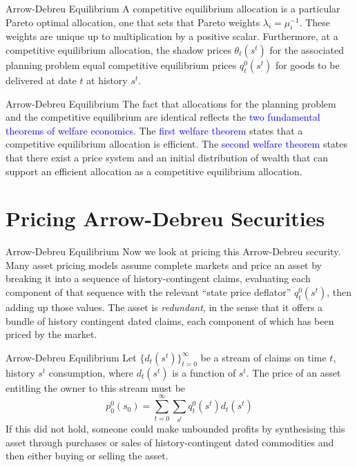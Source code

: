 \documentclass[aspectratio=169,xcolor=dvipsnames]{beamer}
\begin{document}
\begin{frame}{Arrow-Debreu Equilibrium}
    A competitive equilibrium allocation is a particular Pareto optimal allocation, one that sets that Pareto weights $\lambda_i = \mu_i^{-1}$. These weights are unique up to multiplication by a positive scalar. Furthermore, at a competitive equilibrium allocation, the shadow prices $\theta_t(s^t)$ for the associated planning problem equal competitive equilibrium prices $q^0_t(s^t)$ for goods to be delivered at date $t$ at history $s^t$.
\end{frame}

\begin{frame}{Arrow-Debreu Equilibrium}
    The fact that allocations for the planning problem and the competitive equilibrium are identical reflects the \textcolor{blue}{two fundamental theorems of welfare economics}. The \textcolor{blue}{first welfare theorem} states that a competitive equilibrium allocation is efficient. The \textcolor{blue}{second welfare theorem} states that there exist a price system and an initial distribution of wealth that can support an efficient allocation as a competitive equilibrium allocation.
\end{frame}

\section{Pricing Arrow-Debreu Securities}

\begin{frame}{Arrow-Debreu Equilibrium}
    Now we look at pricing this Arrow-Debreu security. Many asset pricing models assume complete markets and price an asset by breaking it into a sequence of history-contingent claims, evaluating each component of that sequence with the relevant ``state price deflator'' $q^0_t(s^t)$, then adding up those values. The asset is \emph{redundant}, in the sense that it offers a bundle of history contingent dated claims, each component of which has been priced by the market.
\end{frame}

\begin{frame}{Arrow-Debreu Equilibrium}
    Let $\{d_t(s^t)\}_{t=0}^\infty$ be a stream of claims on time $t$, history $s^t$ consumption, where $d_t(s^t)$ is a function of $s^t$. The price of an asset entitling the owner to this stream must be
    \[
        p^0_0(s_0) = \sum_{t=0}^\infty \sum_{s^t} q^0_t(s^t) d_t(s^t)
    \]
    If this did not hold, someone could make unbounded profits by synthesising this asset through purchases or sales of history-contingent dated commodities and then either buying or selling the asset.
\end{frame}
\end{document}
